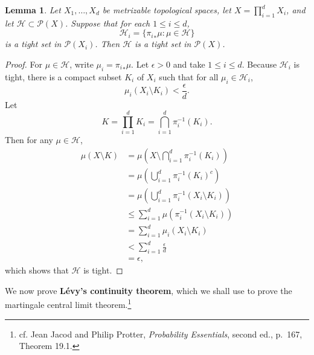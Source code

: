\documentclass{article}
\newtheorem{lemma}[theorem]{Lemma}
\theoremstyle{definition}
\begin{document}
\begin{lemma}
Let $X_1,\ldots,X_d$ be metrizable topological spaces, let
$X=\prod_{i=1}^d X_i$,  and let $\mathscr{H} \subset \mathscr{P}(X)$.
Suppose that for each $1 \leq i \leq d$,
\[
\mathscr{H}_i = \{{\pi_i}_*\mu: \mu \in \mathscr{H}\}
\]
is a tight set in $\mathscr{P}(X_i)$. Then $\mathscr{H}$ is a tight set in $\mathscr{P}(X)$.
\label{producttight}
\end{lemma}
\begin{proof}
For $\mu \in \mathscr{H}$, write $\mu_i = {\pi_i}_* \mu$.
Let $\epsilon>0$ and take $1 \leq i \leq d$. 
Because $\mathscr{H}_i$ is tight,
there is a compact subset $K_i$ of $X_i$ such that for all $\mu_i \in \mathscr{H}_i$,
\[
\mu_i(X_i \setminus K_i) < \frac{\epsilon}{d}.
\]
Let
\[
K=\prod_{i=1}^d K_i =  \bigcap_{i=1}^d \pi_i^{-1}(K_i).
\]
Then for any $\mu \in \mathscr{H}$,
\begin{align*}
\mu(X \setminus K)&=\mu\left(X \setminus \bigcap_{i=1}^d \pi_i^{-1}(K_i) \right)\\
&=\mu\left( \bigcup_{i=1}^d \pi_i^{-1}(K_i)^c \right)\\
&=\mu\left( \bigcup_{i=1}^d \pi_i^{-1}(X_i \setminus K_i) \right)\\
&\leq \sum_{i=1}^d \mu(\pi_i^{-1}(X_i \setminus K_i))\\
&=\sum_{i=1}^d \mu_i(X_i \setminus K_i)\\
&< \sum_{i=1}^d \frac{\epsilon}{d}\\
&=\epsilon,
\end{align*}
which shows that $\mathscr{H}$ is tight.
\end{proof}




We now prove \textbf{L\'evy's continuity theorem}, which we shall use to prove the martingale central limit theorem.\footnote{cf. Jean Jacod and Philip Protter, {\em Probability Essentials}, second ed., p.~167, Theorem 19.1.}
\end{document}
